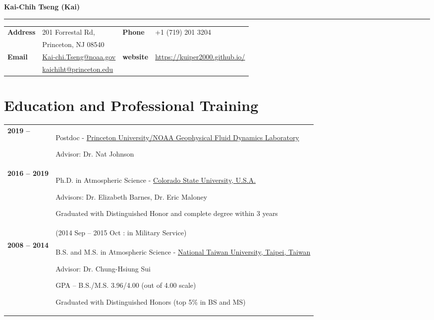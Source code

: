 \documentclass{article}
\begin{document}
{\huge\color{airforceblue}\textbf{Kai-Chih Tseng (Kai)}\par}
\rule{\textwidth}{0.5mm}\par

\vspace{5ex}

\begin{tabular}{
		>{\bfseries}p{.20\linewidth}
		p{.4\linewidth}
		>{\bfseries}p{.1\linewidth}
		p{.25\linewidth}
	}
	Address       & 201 Forrestal Rd,          &  Phone  & +1 (719) 201 3204 \\
	              & Princeton, NJ 08540          &    &  \\
	Email         & \href{mailto:Kai-chi.Tseng@noaa.gov}{Kai-chi.Tseng@noaa.gov} & website & \href{https://kuiper2000.github.io/}{https://kuiper2000.github.io/}    \\
                  & \href{mailto:kaichiht@princeton.edu}{kaichiht@princeton.edu} &       &     \\
\end{tabular}

\section{\color{airforceblue}Education and Professional Training}
\begin{tabular}{>{\bfseries}p{2.5cm}p{\linewidth-2.5cm\relax}}
	2019  --   & Postdoc -
	\href{https://www.princeton.edu/}{Princeton University/NOAA Geophysical Fluid Dynamics Laboratory}\par
	Advisor: Dr. Nat Johnson \par
    \\
	2016  -- 2019  & Ph.D. in Atmospheric Science -
	\href{https://www.colostate.edu/}{Colorado State University, U.S.A.}\par
	Advisors: Dr. Elizabeth Barnes, Dr. Eric Maloney \par
	Graduated with Distinguished Honor and complete degree within 3 years\par
	\\
	 & (2014 Sep -- 2015 Oct : in Military Service) \par
	\\
	2008 -- 2014 & B.S. and M.S. in Atmospheric Science -
	\href{https://www.ntu.edu.tw/}{National Taiwan University,
	Taipei, Taiwan}\par
	Advisor: Dr. Chung-Hsiung Sui \par
	GPA -- B.S./M.S. 3.96/4.00 (out of 4.00 scale) \par
	Graduated with Distinguished Honors (top 5\% in BS and MS) \par
	

\end{tabular}
\end{document}
